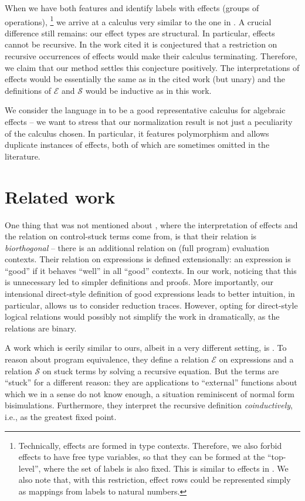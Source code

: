 \documentclass[a4paper, 11pt,titlepage, openright, twoside]{report}
\newcommand{\E}{\mathcal{E}}
\renewcommand{\S}{\mathcal{S}}
\newcommand{\+}{\enspace}
\begin{document}
When we have both features and identify labels with effects (groups of operations),%
\footnote{
	Technically, effects are formed in type contexts. Therefore,
	we also forbid effects to have free type variables, so that they can be formed
	at the ``top-level'', where the set of labels is also fixed.
	This is similar to effects in \cite{hwc}.
	We also note that, with this restriction, effect rows could be represented
	simply as mappings from labels to natural numbers.
}
we arrive at a calculus very similar to the one in \cite{hwc}.
A crucial difference still remains: our effect types are structural.
In particular, effects cannot be recursive.
In the work cited it is conjectured that a restriction on recursive occurrences of effects would
make their calculus terminating.
Therefore, we claim that our method settles this conjecture positively.
The interpretations
of effects would be essentially the same as in the cited work (but unary)
and the definitions of $\E$ and $\S$ would be inductive as in this work.

We consider the language in \cite{hwc} to be a good representative
calculus for algebraic effects
– we want to stress that our normalization result is not just a
peculiarity of the calculus chosen.
In particular, it features polymorphism and allows duplicate instances of effects,
both of which are sometimes omitted in the literature.

\section{Related work}

One thing that was not mentioned about \cite{hwc}, where the interpretation of effects
and the relation on control-stuck terms come from,
is that their relation is {\em biorthogonal}
– there is an additional relation on (full program) evaluation contexts.
Their relation on expressions is defined extensionally:
an expression is ``good'' if it behaves ``well'' in all ``good'' contexts.
In our work, noticing that this is unnecessary led to simpler definitions and proofs.
More importantly, our intensional direct-style definition of good expressions leads to
better intuition, in particular, allows us to consider reduction traces.
However, opting for direct-style logical relations would possibly not simplify the work
in \cite{hwc} dramatically,
as the relations are binary.

A work which is eerily similar to ours, albeit in a very different setting, is \cite{marriage}.
To reason about program equivalence,
they define a relation $\E$ on expressions
and a relation $\S$ on stuck terms
by solving a recursive equation.
But the terms are ``stuck'' for a different reason:
they are applications to ``external'' functions about which we in a sense do not know enough,
a situation reminiscent of normal form bisimulations.
Furthermore, they interpret the recursive definition {\em coinductively},
i.e., as the greatest fixed point.
\end{document}
